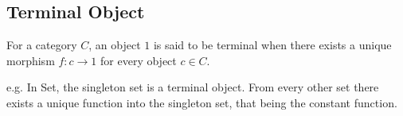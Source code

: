 \subsection{Terminal Object}

For a category $C$, an object $1$ is said to be terminal when there exists a
unique morphism $f: c\to 1$ for every object $c\in C$.
\parencite{awodey:category_theory}

e.g. In Set, the singleton set is a terminal object. From every other set
there exists a unique function into the singleton set, that being the constant
function.